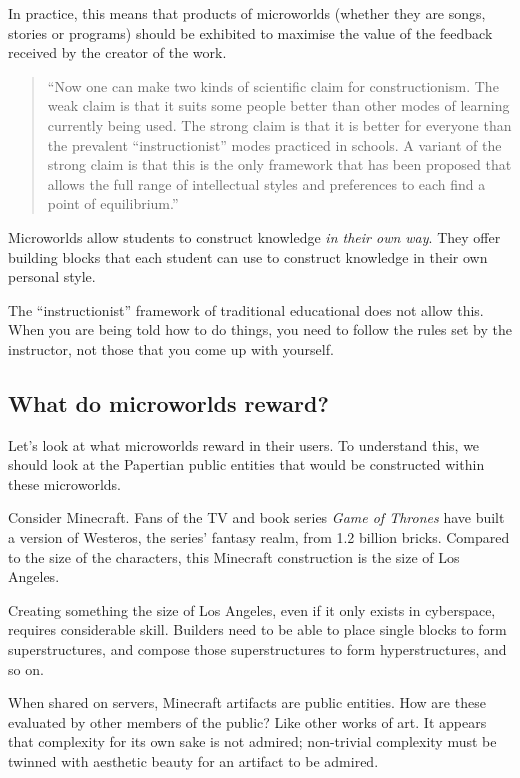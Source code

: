 In practice, this means that products of microworlds (whether they are
songs, stories or programs) should be exhibited to maximise the value of the feedback received by the creator of the work.

\begin{quote}
``Now one can make two kinds of scientific claim for constructionism. The
weak claim is that it suits some people better than other modes of
learning currently being used. The strong claim is that it is better for
everyone than the prevalent ``instructionist'' modes practiced in
schools. A variant of the strong claim is that this is the only
framework that has been proposed that allows the full range of
intellectual styles and preferences to each find a point of equilibrium.''\cite{sitconst}
\end{quote}

Microworlds allow students to construct knowledge \emph{in their own
way}. They offer building blocks that each student can use to construct knowledge in their own
personal style. 

The ``instructionist'' framework of traditional educational does not allow this. When you are being told how to do things, you need to follow the rules set by the instructor, not those that you come up with yourself.

\subsection{What do microworlds reward?}

Let's look at what microworlds reward in their users. To understand
this, we should look at the Papertian public entities that would be
constructed within these microworlds.

Consider Minecraft. Fans of the TV and book series \emph{Game of
Thrones} have built a version of Westeros, the series' fantasy realm,
from 1.2 billion bricks. Compared to the size of the characters, this
Minecraft construction is the size of Los Angeles\cite{westeroscraft}.

Creating something the size of Los Angeles, even if it only exists in
cyberspace, requires considerable skill. Builders need to be able to
place single blocks to form superstructures, and compose those
superstructures to form hyperstructures, and so on\cite{reddit:minecraft}.

When shared on servers, Minecraft artifacts are public entities. How are
these evaluated by other members of the public? Like other works of art.
It appears that complexity for its own sake is not admired; non-trivial
complexity must be twinned with aesthetic beauty for an artifact to be
admired\cite{mash}.

